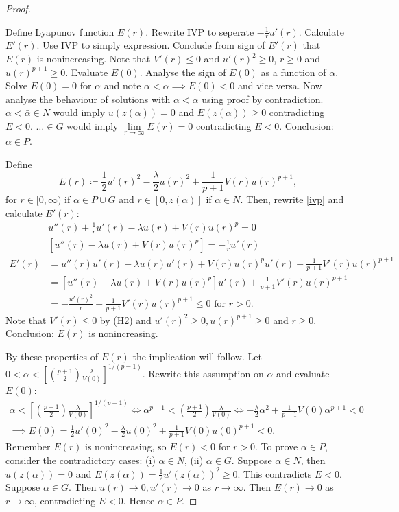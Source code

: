 \begin{lemma}
\begin{proof}
  \begin{outline}
    \1 Define Lyapunov function $E(r)$.
    \1 Rewrite IVP to seperate $-\frac{1}{r}u'(r)$.
    \1 Calculate $E'(r)$.
    \1 Use IVP to simply expression.
    \1 Conclude from sign of $E'(r)$ that $E(r)$ is nonincreasing.
      \2 Note that $V'(r)\leq0$ and $u'(r)^2\geq0$, $r\geq0$ and $u(r)^{p+1}\geq0$.
    \1 Evaluate $E(0)$. Analyse the sign of $E(0)$ as a function of $\alpha$.
      \2 Solve $E(0)=0$ for $\bar\alpha$ and note $\alpha<\bar\alpha\implies E(0)<0$ and vice versa.
    \1 Now analyse the behaviour of solutions with $\alpha<\bar\alpha$ using proof by contradiction.
      \2 $\alpha<\bar\alpha\in N$ would imply $u(z(\alpha))=0$ and $E(z(\alpha))\geq0$ contradicting $E<0$.
      \2 $\ldots\in G$ would imply $\underset{r\to\infty}{\lim}E(r)=0$ contradicting $E<0$.
    \1 Conclusion: $\alpha\in P$.
  \end{outline}
Define $$E(r)\coloneqq\frac{1}{2}u'(r)^2-\frac{\lambda}{2}u(r)^2+\frac{1}{p+1}V(r)u(r)^{p+1},$$  for $r\in[0,\infty)$ if $\alpha\in P\cup G$ and $r\in[0,z(\alpha)]$ if $\alpha\in N$. Then, rewrite \ref{ivp} and calculate $E'(r)$: \begin{align*} &u''(r)+\frac{1}{r}u'(r)-\lambda u(r)+V(r)u(r)^p=0\\
&\left[u''(r)-\lambda u(r)+V(r)u(r)^p\right]=-\frac{1}{r}u'(r)\\
E'(r)&=u''(r)u'(r)-\lambda u(r)u'(r)+V(r)u(r)^pu'(r)+\frac{1}{p+1}V'(r)u(r)^{p+1}\\
&=\left[u''(r)-\lambda u(r)+V(r)u(r)^p\right]u'(r)+\frac{1}{p+1}V'(r)u(r)^{p+1}\\
&=-\frac{u'(r)^2}{r}+\frac{1}{p+1}V'(r)u(r)^{p+1}\leq0\text{ for }r>0.
\end{align*} Note that $V'(r)\leq0$ by (H2) and $u'(r)^2\geq0, u(r)^{p+1}\geq0$ and $r\geq0$. Conclusion: $E(r)$ is nonincreasing.

By these properties of $E(r)$ the implication will follow. Let $0<\alpha<\left[\left(\frac{p+1}{2}\right)\frac{\lambda}{V(0)} \right]^{1/(p-1)}.$ Rewrite this assumption on $\alpha$ and evaluate $E(0)$: \begin{gather*}\alpha<\left[\left(\frac{p+1}{2}\right)\frac{\lambda}{V(0)} \right]^{1/(p-1)}\iff\alpha^{p-1}<\left(\frac{p+1}{2}\right)\frac{\lambda}{V(0)}\iff
-\frac{\lambda}{2}\alpha^2+\frac{1}{p+1}V(0)\alpha^{p+1}<0\\\implies E(0)=\frac{1}{2}u'(0)^2-\frac{\lambda}{2}u(0)^2+\frac{1}{p+1}V(0)u(0)^{p+1}<0.\end{gather*} Remember $E(r)$ is nonincreasing, so $E(r)<0$ for $r>0$. To prove $\alpha\in P$, consider the contradictory cases: (i) $\alpha\in N$, (ii) $\alpha\in G$. Suppose $\alpha\in N$, then $u(z(\alpha))=0$ and $E(z(\alpha))=\frac{1}{2}u'(z(\alpha))^2\geq0$. This contradicts $E<0$. Suppose $\alpha\in G$. Then $u(r)\to0,u'(r)\to0$ as $r\to\infty$. Then $E(r)\to0$ as $r\to\infty$, contradicting $E<0$. Hence $\alpha\in P$.
\end{proof}
\end{lemma}


